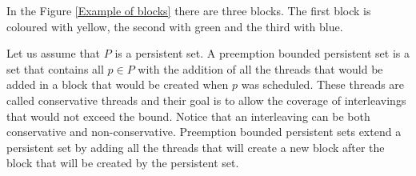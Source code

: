 In the Figure \ref{Example of blocks} there are three blocks. The first block is coloured with yellow, the second with green and the third with blue.


Let us assume that $P$ is a persistent set. A preemption bounded persistent set is a set that contains all $p \in P$ with the addition of all the 
threads that would be added in a block that would be created when $p$ was scheduled. These threads are called conservative threads and their 
goal is to allow the coverage of interleavings that would not exceed the bound. Notice that an interleaving can be both conservative and non-conservative.
Preemption bounded persistent sets extend a persistent set by adding all the threads that will create a new block
after the block that will be created by the persistent set.

